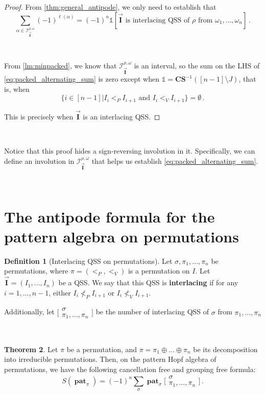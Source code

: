 \documentclass[12pt, reqno]{amsart}
\theoremstyle{definition}
\newtheorem{thm}{Theorem}[section]
\newtheorem{defin}[thm]{Definition}
\newcommand{\III}{\vec{\mathbf{I}}}
\DeclareMathOperator{\pat}{\mathbf{pat}}
\begin{document}
\begin{proof}
From \cref{thm:general_antipode}, we only need to establish that
\begin{equation}\label{eq:packed_alternating_sum}
\sum_{\alpha\in \mathcal I^{\rho, \omega}_{\III}} (-1)^{\ell (\alpha)} = (-1)^n \mathbb{1}[\III \text{ is interlacing QSS of $\rho$ from } \omega_1, \dots, \omega_n]\, .      
\end{equation}

\

From \cref{lm:minpacked}, we know that $\mathcal I^{\rho, \omega}_{\III}$ is an interval, so the sum on the LHS of \eqref{eq:packed_alternating_sum} is zero except when $\mathbb{1} = \mathbf{CS}^{-1}([n-1]\setminus J)$, that is, when 
$$\{i \in [n-1] | I_i <_P I_{i+1} \text{ and } I_i <_V I_{i+1} \} = \emptyset \, .$$

This is precisely when $\III$ is an interlacing QSS.
\end{proof}

\

Notice that this proof hides a sign-reversing involution in it.
Specifically, we can define an involution in $\mathcal I^{\rho, \omega}_{\III}$ that helps us establish \eqref{eq:packed_alternating_sum}.

\

\section{The antipode formula for the pattern algebra on permutations \label{sec:formula_permutation}}

\begin{defin}[Interlacing QSS on permutations]
Let $\sigma, \pi_1, \dots, \pi_n$ be permutations, where $\pi = (<_P, <_V)$ is a permutation on $I$.
Let $\III = (I_1, \dots, I_n)$ be a QSS.
We say that this QSS is \textbf{interlacing} if for any $i = 1, \dots, n-1$, either $I_i \not<_P I_{i+1}$ or $I_i \not<_V I_{i+1}$.

Additionally, let $ \bigl[\!\begin{smallmatrix} \sigma \\ \pi_1, \dots, \pi_n \end{smallmatrix}\!\bigr]$ be the number of interlacing QSS of $\sigma$ from $\pi_1, \dots, \pi_n$
\end{defin}

\

\begin{thm}\label{thm:antipode_perms}
Let $\pi $ be a permutation, and $\pi = \pi_1 \oplus \dots \oplus \pi_n$ be its decomposition into irreducible permutations.
Then, on the pattern Hopf algebra of permutations, we have the following cancellation free and grouping free formula:
$$S(\pat_{\pi}) = (-1)^n \sum_{\sigma} \pat_{\sigma} \bigl[\!\begin{smallmatrix} \sigma \\ \pi_1, \dots, \pi_n \end{smallmatrix}\!\bigr] \, .$$
\end{thm}
\end{document}
